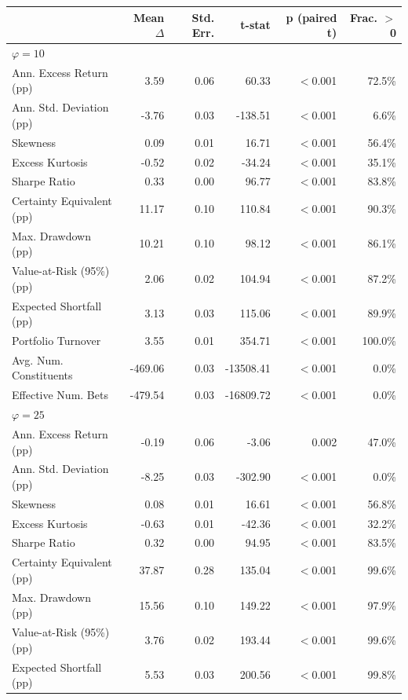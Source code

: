 \begin{tabular*}{\textwidth}{l@{\extracolsep{\fill}}rrrrr}
\toprule
 & Mean $\Delta$ & Std. Err. & t-stat & p (paired t) & Frac. $>$ 0 \\
\midrule
\multicolumn{6}{l}{\textit{$\varphi = 10$}} \\
\midrule
Ann. Excess Return (pp) & 3.59 & 0.06 & 60.33 & $<$0.001 & 72.5\% \\
Ann. Std. Deviation (pp) & -3.76 & 0.03 & -138.51 & $<$0.001 & 6.6\% \\
Skewness & 0.09 & 0.01 & 16.71 & $<$0.001 & 56.4\% \\
Excess Kurtosis & -0.52 & 0.02 & -34.24 & $<$0.001 & 35.1\% \\
Sharpe Ratio & 0.33 & 0.00 & 96.77 & $<$0.001 & 83.8\% \\
Certainty Equivalent (pp) & 11.17 & 0.10 & 110.84 & $<$0.001 & 90.3\% \\
Max. Drawdown (pp) & 10.21 & 0.10 & 98.12 & $<$0.001 & 86.1\% \\
Value-at-Risk (95\%) (pp) & 2.06 & 0.02 & 104.94 & $<$0.001 & 87.2\% \\
Expected Shortfall (pp) & 3.13 & 0.03 & 115.06 & $<$0.001 & 89.9\% \\
Portfolio Turnover & 3.55 & 0.01 & 354.71 & $<$0.001 & 100.0\% \\
Avg. Num. Constituents & -469.06 & 0.03 & -13508.41 & $<$0.001 & 0.0\% \\
Effective Num. Bets & -479.54 & 0.03 & -16809.72 & $<$0.001 & 0.0\% \\
\midrule
\multicolumn{6}{l}{\textit{$\varphi = 25$}} \\
\midrule
Ann. Excess Return (pp) & -0.19 & 0.06 & -3.06 & 0.002 & 47.0\% \\
Ann. Std. Deviation (pp) & -8.25 & 0.03 & -302.90 & $<$0.001 & 0.0\% \\
Skewness & 0.08 & 0.01 & 16.61 & $<$0.001 & 56.8\% \\
Excess Kurtosis & -0.63 & 0.01 & -42.36 & $<$0.001 & 32.2\% \\
Sharpe Ratio & 0.32 & 0.00 & 94.95 & $<$0.001 & 83.5\% \\
Certainty Equivalent (pp) & 37.87 & 0.28 & 135.04 & $<$0.001 & 99.6\% \\
Max. Drawdown (pp) & 15.56 & 0.10 & 149.22 & $<$0.001 & 97.9\% \\
Value-at-Risk (95\%) (pp) & 3.76 & 0.02 & 193.44 & $<$0.001 & 99.6\% \\
Expected Shortfall (pp) & 5.53 & 0.03 & 200.56 & $<$0.001 & 99.8\% \\

\end{tabular*}

